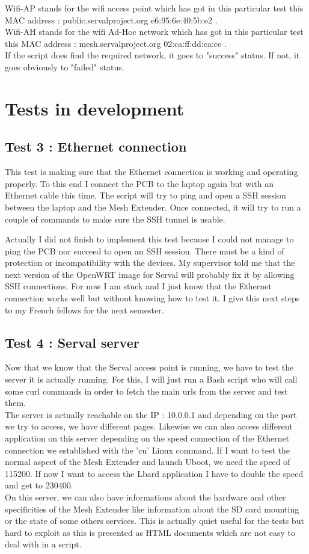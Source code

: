 Wifi-AP stands for the wifi access point which has got in this particular test this MAC address : public.servalproject.org e6:95:6e:40:5b:e2 .
\\
Wifi-AH stands for the wifi Ad-Hoc network which has got in this particular test this MAC address : mesh.servalproject.org 02:ca:ff:dd:ca:ce .
\\
If the script does find the required network, it goes to "success" status. If not, it goes obviously to "failed" status. 

\section{Tests in development}

\subsection{Test 3 : Ethernet connection}
This test is making sure that the Ethernet connection is working and operating properly. To this end I connect the PCB to the laptop again but with an Ethernet cable this time. The script will try to ping and open a SSH session between the laptop and the Mesh Extender. Once connected, it will try to run a couple of commands to make sure the SSH tunnel is usable. 
\par
Actually I did not finish to implement this test because I could not manage to ping the PCB nor succeed to open an SSH session. There must be a kind of protection or incompatibility with the devices. My supervisor told me that the next version of the OpenWRT image for Serval will probably fix it by allowing SSH connections. For now I am stuck and I just know that the Ethernet connection works well but without knowing how to test it. I give this next steps to my French fellows for the next semester. 

\subsection{Test 4 : Serval server}

Now that we know that the Serval access point is running, we have to test the server it is actually running. For this, I will just run a Bash script who will call some curl commands in order to fetch the main urls from the server and test them.
\\
The server is actually reachable on the IP : 10.0.0.1 and depending on the port we try to access, we have different pages. Likewise we can also access different application on this server depending on the speed connection of the Ethernet connection we established with the 'cu' Linux command. If I want to test the normal aspect of the Mesh Extender and launch Uboot, we need the speed of 115200. If now I want to access the Lbard application I have to double the speed and get to 230400.
\\
On this server, we can also have informations about the hardware and other specificities of the Mesh Extender like information about the SD card mounting or the state of some others services. This is actually quiet useful for the tests but hard to exploit as this is presented as HTML documents which are not easy to deal with in a script. 
